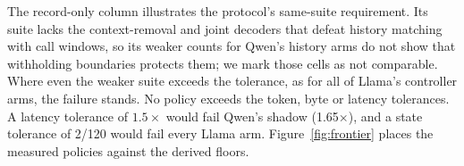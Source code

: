 The record-only column illustrates the protocol's same-suite requirement. Its suite lacks the context-removal and joint decoders that defeat history matching with call windows, so its weaker counts for Qwen's history arms do not show that withholding boundaries protects them; we mark those cells as not comparable. Where even the weaker suite exceeds the tolerance, as for all of Llama's controller arms, the failure stands. No policy exceeds the token, byte or latency tolerances. A latency tolerance of $1.5\times$ would fail Qwen's shadow (1.65$\times$), and a state tolerance of 2/120 would fail every Llama arm. Figure~\ref{fig:frontier} places the measured policies against the derived floors.



